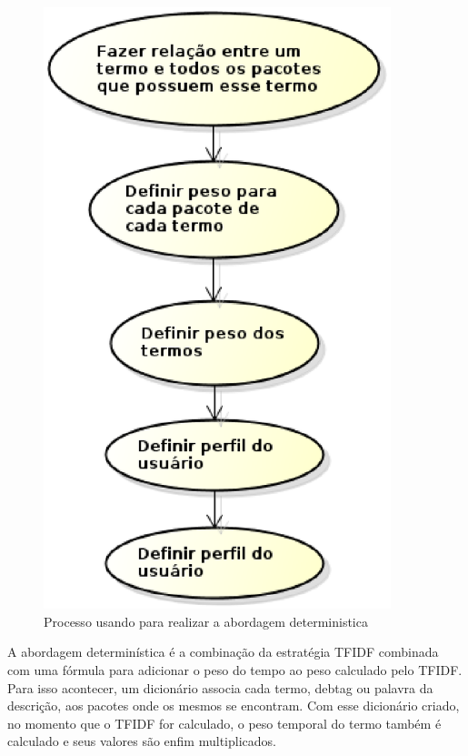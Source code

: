 \begin{figure}[h]
  \centering
  \includegraphics[width=0.9\textwidth]{figuras/abordagem_deterministica.eps}
  \caption{Processo usando para realizar a abordagem deterministica}
  \label{fig:abordagem_deterministica}
\end{figure}

A abordagem determinística é a combinação da estratégia TFIDF combinada com
uma fórmula para adicionar o peso do tempo ao peso calculado pelo TFIDF. Para
isso acontecer, um dicionário associa cada termo, debtag ou palavra da
descrição, aos pacotes onde os mesmos se encontram. Com esse dicionário criado,
no momento que o TFIDF for calculado, o peso temporal do termo também é
calculado e seus valores são enfim multiplicados.

